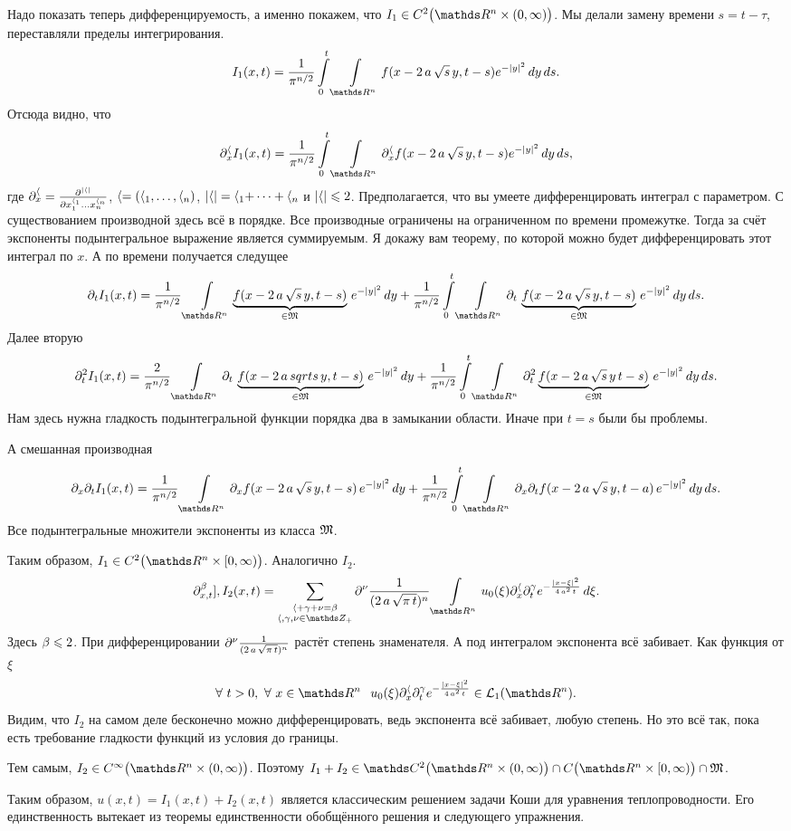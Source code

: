 \begin{Proof}
Надо показать теперь дифференцируемость, а именно покажем, что $I_1\in C^2\big(\R^n\times(0,\infty)\big)$. Мы делали замену времени $s = t-\tau$, переставляли пределы интегрирования.
\[
 I_1(x,t) = \frac1{\pi^{n/2}}\int\limits_0^t\Gint{\R^n}f(x-2\,a\,\sqrt s\,y,t-s)e^{-|y|^2}\,dy\,ds.
\]
Отсюда видно, что
\[
  \dl^\a_x I_1(x,t) = \frac1{\pi^{n/2}}\int\limits_0^t\Gint{\R^n}\dl^\a_x f(x-2\,a\,\sqrt s\,y,t-s)e^{-|y|^2}\,dy\,ds,
\]
где $\partial^\langle_x = \frac{\partial ^{|\langle|}}{\partial x_1^{\langle_1}\dots x_n^{\langle_n}}$, $\langle = (\langle_1,\dots,\langle_n)$, $|\langle|=\langle_1+\dots+\langle_n$ и $|\langle|\leqslant2$. Предполагается, что вы умеете дифференцировать интеграл с параметром. С существованием производной здесь всё в порядке. Все производные ограничены на ограниченном по времени промежутке. Тогда за счёт экспоненты подынтегральное выражение является суммируемым. Я докажу вам теорему, по которой можно будет дифференцировать этот интеграл по $x$. А по времени получается следущее
\[
\dl_t I_1(x,t) =
 \frac1{\pi^{n/2}}\Gint{\R^n} \underbrace{f(x-2\,a\,\sqrt s\,y,t-s)}_{\in\M}\,e^{-|y|^2}\,dy + 
  \frac1{\pi^{n/2}}\int\limits_0^t\Gint{\R^n}\dl_t\,\underbrace{f(x-2\,a\,\sqrt s\,y,t-s)}_{\in\M}
    \,e^{-|y|^2}\,dy\,ds.
\]
Далее вторую
\[
\dl^2_t I_1(x,t) = 
  \frac2{\pi^{n/2}}\Gint{\R^n}\dl_t\,\underbrace{f(x-2\,a\,sqrt s\,y,t-s)}_{\in\M}\,e^{-|y|^2}\,dy +
  \frac1{\pi^{n/2}}\int\limits_0^t\Gint{\R^n}\dl^2_t
  \underbrace{ f(x-2\,a\,\sqrt s\,y\,t-s)}_{\in\M}\,e^{-|y|^2}\,dy\,ds.
\]
Нам здесь нужна гладкость подынтегральной функции порядка два в замыкании области. Иначе при $t=s$ были бы проблемы.

А смешанная производная
\[
\dl_x\dl_t I_1(x,t) = \frac1{\pi^{n/2}}\Gint{\R^n}\dl_x f(x-2\,a\,\sqrt s\,y,t-s)\,e^{-|y|^2}\,dy + 
  \frac1{\pi^{n/2}}\int\limits_0^t\Gint{\R^n}\dl_x\dl_t f(x-2\,a\,\sqrt s\,y,t-a)\,e^{-|y|^2}\,dy\,ds.
\]
Все подынтегральные множители экспоненты из класса $\mathfrak M$.

Таким образом, $I_1\in C^2\big(\R^n\times[0,\infty)\big)$. Аналогично $I_2$.
\[
  \dl_{x,t}^\b],I_2(x,t) = \sum\limits_{\substack{\a+\g+\nu=\b\\\a,\g,\nu\in\Z_+}}
  \dl^\nu\frac1{(2\,a\,\sqrt{\pi\,t})^n}
  \Gint{\R^n}
   u_0(\xi)\dl_x^\a \dl_t^\g 
   e^{-\frac{|x-\xi|^2}{4\,a^2\,t}}
  \,d\xi.
\]
Здесь $\beta\leqslant2$. При дифференцировании 
$  \partial^\nu\frac1{(2\,a\,\sqrt{\pi\,t})^n}$ растёт степень знаменателя. А под интегралом экспонента всё забивает. Как функция от $\xi$
\[
   \forall\ t>0,\ \forall\ x\in\R^n\pau 
   u_0(\xi)\dl_x^\a \dl_t^\g 
   e^{-\frac{|x-\xi|^2}{4\,a^2\,t}}
  \in\L_1(\R^n).
\]
Видим, что $I_2$ на самом деле бесконечно можно дифференцировать, ведь экспонента всё забивает, любую степень. Но это всё так, пока есть требование гладкости функций из условия до границы.

Тем самым, $I_2\in C^\infty\big(\R^n\times(0,\infty)\big)$. Поэтому $I_1+I_2\in\C^2\big(\R^n\times(0,\infty)\big)\cap C\big(\R^n\times[0,\infty)\big)\cap \M$.

Таким образом, $u(x,t) = I_1(x,t) + I_2(x,t)$ является классическим решением задачи Коши для уравнения теплопроводности. Его единственность вытекает из теоремы единственности обобщённого решения и следующего упражнения.
\end{Proof}

